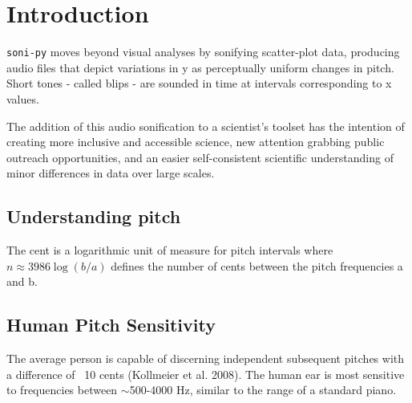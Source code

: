 \documentclass[]{acmsiggraph}
\begin{document}
\section{Introduction} \label{sec:introduction}

\texttt{soni-py} moves beyond visual analyses by sonifying scatter-plot data, producing audio files that depict variations in y as perceptually uniform changes in pitch. Short tones - called blips - are sounded in time at intervals corresponding to x values.

The addition of this audio sonification to a scientist's toolset has the intention of creating more inclusive and accessible science, new attention grabbing public outreach opportunities, and an easier self-consistent scientific understanding of minor differences in data over large scales.




\subsection{Understanding pitch}
The cent is a logarithmic unit of measure for pitch intervals where $n \approx 3986\log(b/a)$ defines the number of cents between the pitch frequencies a and b.

\subsection{Human Pitch Sensitivity}
The average person is capable of discerning independent subsequent pitches with a difference of ~10 cents (Kollmeier et al. 2008). The human ear is most sensitive to frequencies between $\sim$500-4000 Hz, similar to the range of a standard piano.
\end{document}
